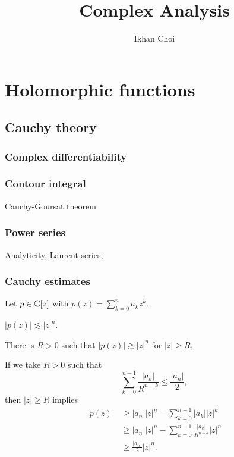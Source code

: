 \documentclass{../note}
\begin{document}
\title{Complex Analysis}
\author{Ikhan Choi}
\maketitle
\tableofcontents


\part{Holomorphic functions}


\chapter{Cauchy theory}
\section{Complex differentiability}
\section{Contour integral}
Cauchy-Goursat theorem

\section{Power series}
Analyticity,
Laurent series,


\section{Cauchy estimates}

\begin{prb}
Let $p\in\mathbb{C}[z]$ with $p(z)=\sum_{k=0}^na_kz^k$.
\begin{parts}
\item $|p(z)|\lesssim|z|^n$.
\item There is $R>0$ such that $|p(z)|\gtrsim|z|^n$ for $|z|\ge R$.
\end{parts}
\end{prb}
\begin{pf}
If we take $R>0$ such that
\[\sum_{k=0}^{n-1}\frac{|a_k|}{R^{n-k}}\le\frac{|a_n|}2,\]
then $|z|\ge R$ implies
\begin{align*}
|p(z)|&\ge|a_n||z|^n-\sum_{k=0}^{n-1}|a_k||z|^k\\
&\ge|a_n||z|^n-\sum_{k=0}^{n-1}\frac{|a_k|}{R^{n-k}}|z|^n\\
&\ge\frac{|a_n|}2|z|^n.
\end{align*}
\end{pf}
\end{document}
